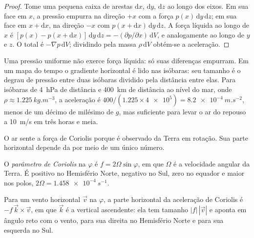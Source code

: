 \begin{proof}
Tome uma pequena caixa de arestas $\mathrm dx$, $\mathrm dy$, $\mathrm dz$ ao longo dos eixos. Em
sua face em $x$, a pressão empurra na direção $+x$ com a força
$p(x)\,\mathrm dy\,\mathrm dz$; em sua face em $x + \mathrm dx$, na direção $-x$ com $p(x + \mathrm dx)\,\mathrm dy\,\mathrm dz$. A força líquida ao longo de $x$ é $[p(x) - p(x + \mathrm dx)]\,\mathrm dy\,\mathrm dz = -(\partial p/\partial
x)\,\mathrm dV$, e analogamente ao longo de $y$ e $z$. O total é $-\nabla p\,
\mathrm dV$; dividindo pela massa $\rho\,\mathrm dV$ obtém-se a aceleração.
\end{proof}

Uma pressão uniforme não exerce força líquida: só suas diferenças empurram. Em um mapa do tempo o
gradiente horizontal é lido nas isóbaras: seu tamanho é o degrau de pressão entre duas isóbaras
dividido pela distância entre elas. Para isóbaras de \qty{4}{hPa} de distância e \qty{400}{km} de
distância ao nível do mar, onde $\rho \approx \qty{1.225}{kg.m^{-3}}$, a aceleração é $400/(1.225 \times \num{4e5}) = \qty{8.2e-4}{m.s^{-2}}$, menos de um décimo de milésimo de $g$, mas suficiente
para levar o ar do repouso a \qty{10}{m/s} em três horas e meia.

O ar sente a força de Coriolis porque é observado da Terra em rotação. Sua parte horizontal depende
da  por meio de um único número.

\begin{definition}\label{def:b1:atmospheric-circulation:coriolis-parameter}
O \emph{parâmetro de Coriolis} na  $\varphi$ é $f = 2\Omega\sin\varphi$,
em que $\Omega$ é a velocidade angular da Terra. É positivo no Hemisfério Norte, negativo no Sul,
zero no equador e maior nos polos, $2\Omega = \qty{1.458e-4}{s^{-1}}$.
\end{definition}

\begin{proposition}\label{prop:b1:atmospheric-circulation:coriolis}
Para um vento horizontal $\vec v$ na  $\varphi$, a parte horizontal da aceleração de Coriolis
é $-f\,\vec k\times\vec v$, em que $\vec k$ é a vertical ascendente: ela tem tamanho $|f|\,|\vec v|$ e
aponta em ângulo reto com o vento, para sua direita no Hemisfério Norte e para sua esquerda no Sul.
\end{proposition}

